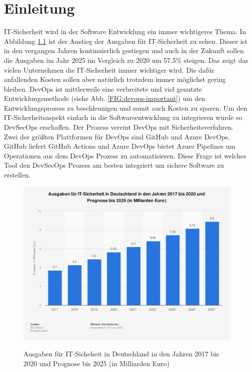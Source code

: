 \chapter{Einleitung}
IT-Sicherheit wird in der Software Entwicklung ein immer wichtigeres  Thema. In Abbildung \ref{FIG:statistic-ausgaben-it-sicherheit} ist der Anstieg der Ausgaben für IT-Sicherheit zu sehen. Dieser ist in den vergangen Jahren kontinuierlich gestiegen und auch in der Zukunft sollen die Ausgaben im Jahr 2025 im Vergleich zu 2020 um 57.5\% steigen. Das zeigt das vielen Unternehmen die IT-Sicherheit immer wichtiger wird. Die dafür anfallenden Kosten sollen aber natürlich trotzdem immer möglichst gering bleiben.
DevOps ist mittlerweile eine verbreitete und viel genutzte Entwicklungsmethode (siehe Abb. \ref{FIG:devops-important}) um den Entwicklungsprozess zu beschleunigen und somit auch Kosten zu sparen. Um den IT-Sicherheitsaspekt einfach in die Softwareentwicklung zu integrieren wurde so DevSecOps erschaffen. Der Prozess vereint DevOps mit Sicherheitsverfahren. \cite{security-model}
Zwei der größten Plattformen für DevOps sind GitHub und Azure DevOps. GitHub liefert GitHub Actions und Azure DevOps bietet Azure Pipelines um Operationen aus dem DevOps Prozess zu automatisieren. Diese Frage ist welches Tool den DevSecOps Prozess am besten integriert um sichere Software zu erstellen.


\begin{figure}[H]
	{\caption{Ausgaben für IT-Sicheheit in Deutschland in den Jahren 2017 bis 2020 und Prognose bis 2025 (in Milliarden Euro)}
		\label{FIG:statistic-ausgaben-it-sicherheit}}
	{\includegraphics[width=1\textwidth]{figures/statistic-ausgaben-it-sicherheit.png}}
\end{figure}

